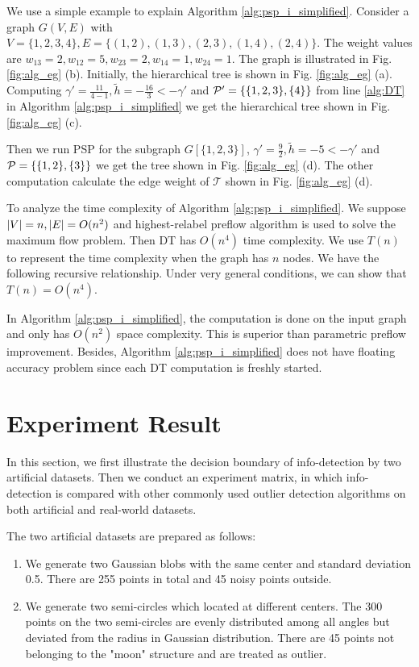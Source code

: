 \documentclass[runningheads]{llncs}
\begin{document}
\begin{example}
	We use a simple example to explain Algorithm \ref{alg:psp_i_simplified}. Consider a graph $G(V, E)$ with $V=\{1,2,3,4\}, E=\{(1,2),(1,3),(2,3),(1,4),(2,4)\}$. The weight values are $w_{13}=2, w_{12}=5, w_{23}=2, w_{14}=1, w_{24}=1$. The graph is illustrated
	in Fig. \ref{fig:alg_eg} (b). Initially, the hierarchical tree is shown in Fig. \ref{fig:alg_eg} (a). Computing $\gamma' = \frac{11}{4-1}, \tilde{h} = -\frac{16}{3} < -\gamma' $ and $\P' = \{\{1,2,3\},\{4\}\}$ from line \ref {alg:DT} in Algorithm \ref{alg:psp_i_simplified} we get the hierarchical tree shown in Fig. \ref{fig:alg_eg} (c).
	
	Then we run PSP for the subgraph $G[\{1,2,3\}]$, $\gamma' = \frac{9}{2}, \tilde{h} = -5 < -\gamma'$ and $\P= \{\{1,2\},\{3\}\}$ we get the tree shown in Fig. \ref{fig:alg_eg} (d). The other computation calculate the edge weight of $\mathcal{T}$ shown in Fig. \ref{fig:alg_eg} (d).
\end{example}		

To analyze the time complexity of Algorithm \ref{alg:psp_i_simplified}. We suppose $\abs{V} = n, \abs{E} = O(n^2)$ and highest-relabel preflow algorithm is used to solve the maximum flow problem. Then DT has $O(n^4)$ time complexity. 
We use $T(n)$ to represent the time complexity when the graph has $n$ nodes. We have the following recursive relationship. Under very general conditions, we can show that $T(n) = O(n^4)$. 

In Algorithm \ref{alg:psp_i_simplified}, the computation is done on the input graph and only has $O(n^2)$ space complexity. This is superior than parametric preflow improvement. Besides, Algorithm \ref{alg:psp_i_simplified} does not have floating accuracy problem since each DT computation is freshly started. 
\section{Experiment Result}
In this section, we first illustrate the decision boundary of info-detection by two artificial datasets. Then we conduct an experiment matrix, in which info-detection is compared with other commonly used outlier detection algorithms on both artificial and real-world datasets.

The two artificial datasets are prepared as follows:
\begin{enumerate}
\item We generate two Gaussian blobs with the same center and standard deviation 0.5. There are 255 points in total and 45 noisy points outside.
\item We generate two semi-circles which located at different centers. The 300 points on the two semi-circles are evenly distributed among all angles but deviated from the radius in Gaussian distribution. There are 45 points not belonging to the "moon" structure and are treated as outlier.
\end{enumerate}
\end{document}
